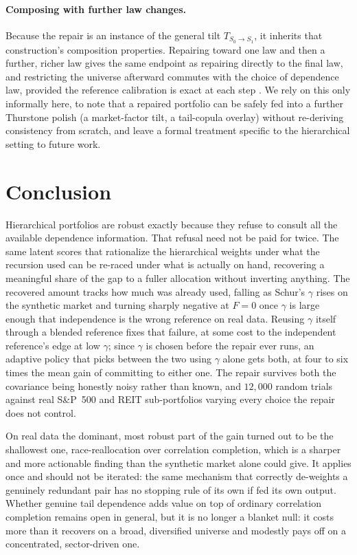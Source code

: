 \documentclass[11pt]{article}
\begin{document}
\paragraph{Composing with further law changes.} Because the repair is an
instance of the general tilt $T_{S_0\to S_1}$, it inherits that
construction's composition properties. Repairing toward one law and then a
further, richer law gives the same endpoint as repairing directly to the
final law, and restricting the universe afterward commutes with the choice
of dependence law, provided the reference calibration is exact at each step
\parencite{cotton2026polish}. We rely on this only informally here, to note
that a repaired portfolio can be safely fed into a further Thurstone polish
(a market-factor tilt, a tail-copula overlay) without re-deriving
consistency from scratch, and leave a formal treatment specific to the
hierarchical setting to future work.

\section{Conclusion}

Hierarchical portfolios are robust exactly because they refuse to consult
all the available dependence information. That refusal need not be paid
for twice. The same latent scores that rationalize the hierarchical weights
under what the recursion used can be re-raced under what is actually on
hand, recovering a meaningful share of the gap to a fuller allocation
without inverting anything. The recovered amount tracks how much was
already used, falling as Schur's $\gamma$ rises on the synthetic market and
turning sharply negative at $F=0$ once $\gamma$ is large enough that
independence is the wrong reference on real data. Reusing $\gamma$ itself
through a blended reference fixes that failure, at some cost to the
independent reference's edge at low $\gamma$; since $\gamma$ is chosen
before the repair ever runs, an adaptive policy that picks between the two
using $\gamma$ alone gets both, at four to six times the mean gain of
committing to either one. The repair survives both the covariance being
honestly noisy rather than known, and $12{,}000$ random trials against real
S\&P~500 and REIT sub-portfolios varying every choice the repair does not
control.

On real data the dominant, most robust part of the gain turned out to be
the shallowest one, race-reallocation over correlation completion, which is
a sharper and more actionable finding than the synthetic market alone could
give. It applies once and should not be iterated: the same mechanism that
correctly de-weights a genuinely redundant pair has no stopping rule of its
own if fed its own output. Whether genuine tail dependence adds value on
top of ordinary correlation completion remains open in general, but it is
no longer a blanket null: it costs more than it recovers on a broad,
diversified universe and modestly pays off on a concentrated, sector-driven
one.
\end{document}
